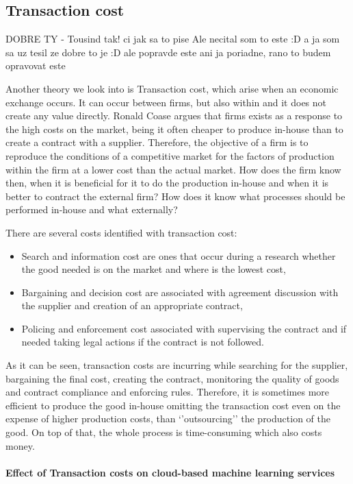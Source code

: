 \subsection{Transaction cost} \label{sec:transaction-cost}
DOBRE TY - Tousind tak! ci jak sa to pise
Ale necital som to este :D
a ja som sa uz tesil ze dobre to je :D ale popravde este ani ja poriadne, rano to budem opravovat este

Another theory we look into is Transaction cost, which arise when an economic exchange occurs. It can occur between firms, but also within and it does not create any value directly. Ronald Coase argues that firms exists as a response to the high costs on the market, being it often cheaper to produce in-house than to create a contract with a supplier. Therefore, the objective of a firm is to reproduce the conditions of a competitive market for the factors of production within the firm at a lower cost than the actual market. How does the firm know then, when it is beneficial for it to do the production in-house and when it is better to contract the external firm? How does it know what processes should be performed in-house and what externally?

There are several costs identified with transaction cost:
\begin{itemize}[noitemsep]
    \item Search and information cost are ones that occur during a research whether the good needed is on the market and where is the lowest cost,
    \item Bargaining and decision cost are associated with agreement discussion with the supplier and creation of an appropriate contract,
    \item Policing and enforcement cost associated with supervising the contract and if needed taking legal actions if the contract is not followed.
\end{itemize}
As it can be seen, transaction costs are incurring while searching for the supplier, bargaining the final cost, creating the contract, monitoring the quality of goods and contract compliance and enforcing rules. Therefore, it is sometimes more efficient to produce the good in-house omitting the transaction cost even on the expense of higher production costs, than ‘’outsourcing’’ the production of the good. On top of that, the whole process is time-consuming which also costs money.

\paragraph{Effect of Transaction costs on cloud-based machine learning services}

